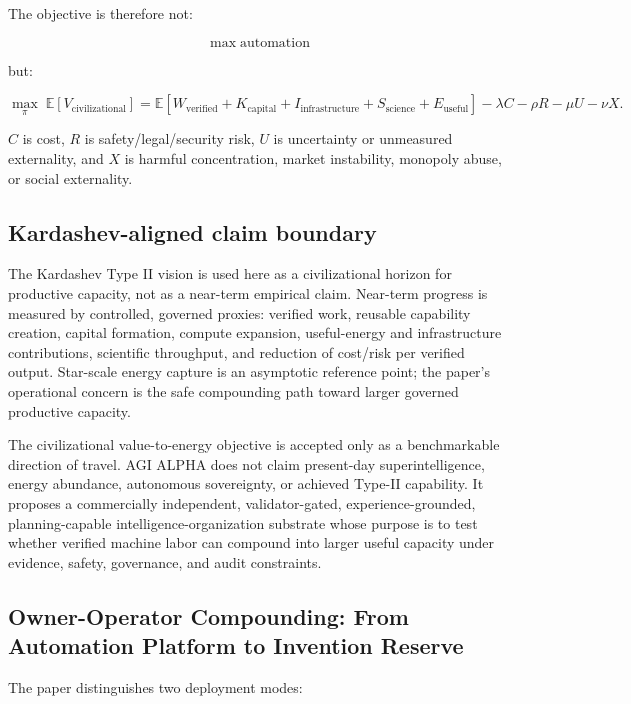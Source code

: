 \documentclass[11pt]{article}
\begin{document}
The objective is therefore not:

\[
\max\;\text{automation}
\]

but:

\[
\max_{\pi}\;\mathbb{E}[V_{\mathrm{civilizational}}]
=
\mathbb{E}[W_{\mathrm{verified}}+K_{\mathrm{capital}}+I_{\mathrm{infrastructure}}+S_{\mathrm{science}}+E_{\mathrm{useful}}]
-\lambda C-\rho R-\mu U-\nu X.
\]

\(C\) is cost, \(R\) is safety/legal/security risk, \(U\) is uncertainty or unmeasured externality, and \(X\) is harmful concentration, market instability, monopoly abuse, or social externality.

\subsection{Kardashev-aligned claim boundary}\label{kardashev-aligned-claim-boundary}

The Kardashev Type II vision is used here as a civilizational horizon for productive capacity, not as a near-term empirical claim. Near-term progress is measured by controlled, governed proxies: verified work, reusable capability creation, capital formation, compute expansion, useful-energy and infrastructure contributions, scientific throughput, and reduction of cost/risk per verified output. Star-scale energy capture is an asymptotic reference point; the paper's operational concern is the safe compounding path toward larger governed productive capacity.

The civilizational value-to-energy objective is accepted only as a benchmarkable direction of travel. AGI ALPHA does not claim present-day superintelligence, energy abundance, autonomous sovereignty, or achieved Type-II capability. It proposes a commercially independent, validator-gated, experience-grounded, planning-capable intelligence-organization substrate whose purpose is to test whether verified machine labor can compound into larger useful capacity under evidence, safety, governance, and audit constraints.

\subsection{Owner-Operator Compounding: From Automation Platform to Invention Reserve}\label{owner-operator-compounding-from-automation-platform-to-invention-reserve}

The paper distinguishes two deployment modes:
\end{document}
